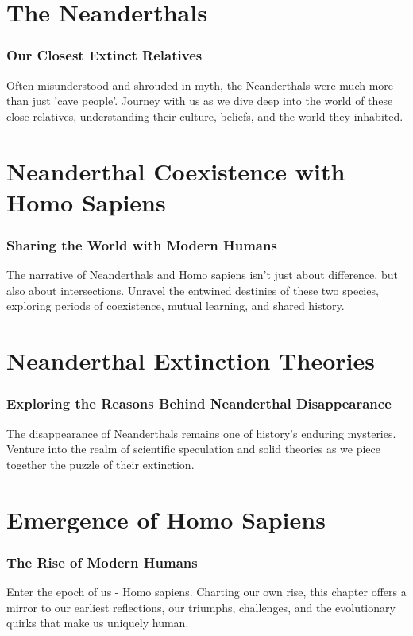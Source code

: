 \documentclass[a4paper,12pt]{book}
\begin{document}
\chapter{The Neanderthals}
\subsection*{Our Closest Extinct Relatives}
Often misunderstood and shrouded in myth, the Neanderthals were much more than just 'cave people'. Journey with us as we dive deep into the world of these close relatives, understanding their culture, beliefs, and the world they inhabited.

\chapter{Neanderthal Coexistence with Homo Sapiens}
\subsection*{Sharing the World with Modern Humans}
The narrative of Neanderthals and Homo sapiens isn't just about difference, but also about intersections. Unravel the entwined destinies of these two species, exploring periods of coexistence, mutual learning, and shared history.

\chapter{Neanderthal Extinction Theories}
\subsection*{Exploring the Reasons Behind Neanderthal Disappearance}
The disappearance of Neanderthals remains one of history's enduring mysteries. Venture into the realm of scientific speculation and solid theories as we piece together the puzzle of their extinction.

\chapter{Emergence of Homo Sapiens}
\subsection*{The Rise of Modern Humans}
Enter the epoch of us - Homo sapiens. Charting our own rise, this chapter offers a mirror to our earliest reflections, our triumphs, challenges, and the evolutionary quirks that make us uniquely human.
\end{document}
